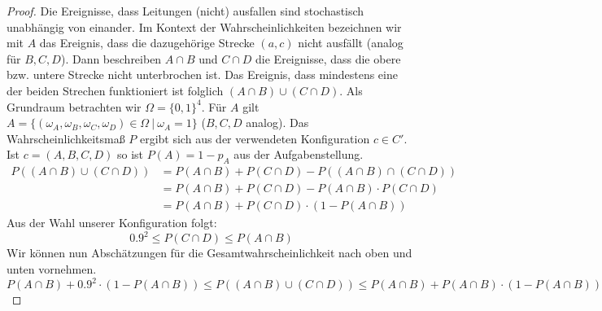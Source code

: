 \documentclass[a4paper]{scrartcl}
\begin{document}
\begin{enumerate}[label=\bfseries\arabic*.]
\begin{proof}
                    Die Ereignisse, dass Leitungen (nicht) ausfallen sind
                    stochastisch unabhängig von einander.
                    Im Kontext der Wahrscheinlichkeiten bezeichnen wir mit $A$
                    das Ereignis, dass die dazugehörige Strecke $(a, c)$ nicht
                    ausfällt (analog für $B, C, D$). 
                    Dann beschreiben $A \cap B$ und $C \cap D$ die Ereignisse,
                    dass die obere bzw. untere Strecke nicht unterbrochen ist.
                    Das Ereignis, dass mindestens eine der beiden Strechen
                    funktioniert ist folglich $(A \cap B) \cup (C \cap D)$.
                    Als Grundraum betrachten wir $\Omega = \{0, 1\}^4$.
                    Für $A$ gilt $A = \{(\omega_A, \omega_B, \omega_C, \omega_D)
                    \in \Omega \ |\ \omega_A = 1\}$ ($B, C, D$ analog).
                    Das Wahrscheinlichkeitsmaß $P$ ergibt sich aus der
                    verwendeten Konfiguration $c \in C'$.
                    Ist $c = (A, B, C, D)$ so ist $P(A) = 1 - p_A$ aus der
                    Aufgabenstellung.
                    \begin{equation*}
                        \begin{split}
                            P((A \cap B) \cup (C \cap D))
                            &= P(A \cap B) + P(C \cap D)
                               - P((A \cap B) \cap (C \cap D)) \\
                            &= P(A \cap B) + P(C \cap D)
                               - P(A \cap B) \cdot P(C \cap D) \\
                            &= P(A \cap B) + P(C \cap D)
                               \cdot (1 - P(A \cap B))
                       \end{split}
                    \end{equation*}
                    Aus der Wahl unserer Konfiguration folgt:
                    \begin{equation*}
                        \num{0.9}^2 \leq P(C \cap D) \leq P(A \cap B)
                    \end{equation*}
                    Wir können nun Abschätzungen für die
                    Gesamtwahrscheinlichkeit nach oben und unten vornehmen.
                    \begin{equation*}
                        P(A \cap B) + \num{0,9}^2 \cdot (1 - P(A \cap B))
                        \leq P((A \cap B) \cup (C \cap D))
                        \leq P(A \cap B) + P(A \cap B) \cdot (1 - P(A \cap B))

\end{equation*}
\end{proof}
\end{enumerate}
\end{document}

